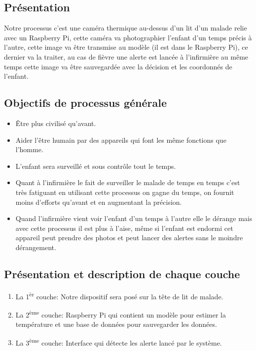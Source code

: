 \documentclass[12pt]{article}
\begin{document}
\subsection{Présentation}
Notre processus c’est une caméra thermique au-dessus d’un lit d’un malade relie avec un Raspberry Pi, cette caméra va photographier l’enfant d'un temps précis à l'autre, cette image va être transmise au modèle (il est dans le Raspberry Pi), ce dernier va la traiter, au cas de fièvre une alerte est lancée à l’infirmière au même temps cette image va être sauvegardée avec la décision et les coordonnés de l’enfant.

\subsection{Objectifs de processus générale}
\begin{itemize}
	\item Être plus civilisé qu’avant.
	\item Aider l’être humain par des appareils qui font les même fonctions que l’homme.
	\item L’enfant sera surveillé et sous contrôle tout le temps.
	\item Quant à l'infirmière le fait de surveiller le malade de temps en temps c'est très fatiguant en utilisant cette processus on gagne du temps, on fournit moins d'efforts qu'avant et en augmentant la précision.	
	\item Quand l'infirmière vient voir l'enfant d'un temps à l'autre elle le dérange mais avec cette processus il est plus à l'aise, même si l'enfant est endormi cet appareil peut prendre des photos et peut lancer des alertes sans le moindre dérangement.
\end{itemize}

\subsection{Présentation et description de chaque couche}
\begin{enumerate}
		\item La 1\textsuperscript{èr} couche: Notre dispositif sera posé sur la tête de lit de malade. 
		\item La 2\textsuperscript{ème} couche: Raspberry Pi qui contient  un modèle pour estimer la température et une base de données pour sauvegarder les données.
		\item La 3\textsuperscript{ème} couche: Interface qui détecte les alerte lancé par le système.
\end{enumerate}
\end{document}
